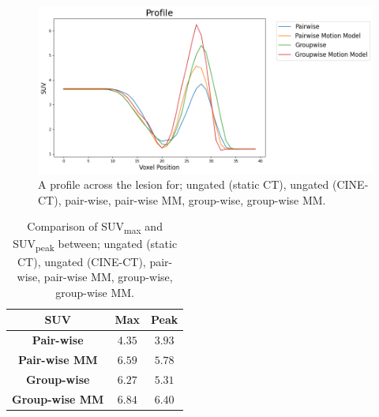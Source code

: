     \begin{figure}
        \vspace{-0.3cm}
        
        \centering
        
        \includegraphics[width=1.0\linewidth]{figures/profile.png}
        
        \vspace{-0.3cm}
        
        \captionsetup{singlelinecheck=false, justification=centering}
        \caption{A profile across the lesion for; ungated (static \gls{CT}), ungated (CINE-\gls{CT}), pair-wise, pair-wise \gls{MM}, group-wise, group-wise \gls{MM}.}
        
        \label{fig:profile}
        
        \vspace{-0.3cm}
    \end{figure}
    
    \begin{table}
        \centering
        
        \captionsetup{singlelinecheck=false, justification=centering}
        \caption{Comparison of \gls{SUV}\textsubscript{max} and \gls{SUV}\textsubscript{peak} between; ungated (static \gls{CT}), ungated (CINE-\gls{CT}), pair-wise, pair-wise \gls{MM}, group-wise, group-wise \gls{MM}.}
        
        \resizebox*{0.8\linewidth}{!}
        {
            \begin{tabular}{||c|cc||}
                \hline
                \textbf{\gls{SUV}}              & \textbf{Max}  & \textbf{Peak} \\
                \hline
                \textbf{Pair-wise}              & $4.35$        & $3.93$ \\
                \textbf{Pair-wise \gls{MM}}     & $6.59$        & $5.78$ \\
                \textbf{Group-wise}             & $6.27$        & $5.31$ \\
                \textbf{Group-wise \gls{MM}}    & $6.84$        & $6.40$ \\
                \hline
            \end{tabular}
        }
        
        \label{tab:suv}
        
        \vspace{-0.3cm}
    \end{table}
    
